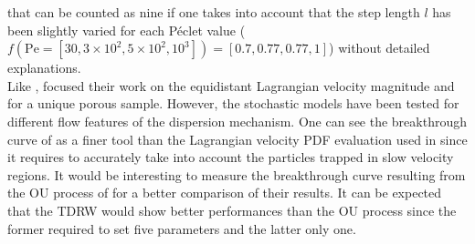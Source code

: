 that can be counted as nine if one takes into account that the step length $l$ has been slightly varied for each Péclet value ($f(\mathrm{Pe}=[30, 3\times 10^2, 5\times 10^2, 10^3])=[0.7,0.77,0.77,1]$) without detailed explanations.\\
Like \citeauthor{Puyguiraud2019}, \citeauthor{Dentz2017} focused their work on the equidistant Lagrangian velocity magnitude and for a unique porous sample. However, the stochastic models have been tested for different flow features of the dispersion mechanism. 
One can see the breakthrough curve of \citeauthor{Dentz2017} as a finer tool than the Lagrangian velocity PDF evaluation used in \citeauthor{Puyguiraud2019} since it requires to accurately take into account the particles trapped in slow velocity regions.
It would be interesting to measure the breakthrough curve resulting from the OU process of \citet{Puyguiraud2019} for a better comparison  of their results.
It can be expected that the TDRW would show better performances than the OU process since the former required to set five parameters and the latter only one.

